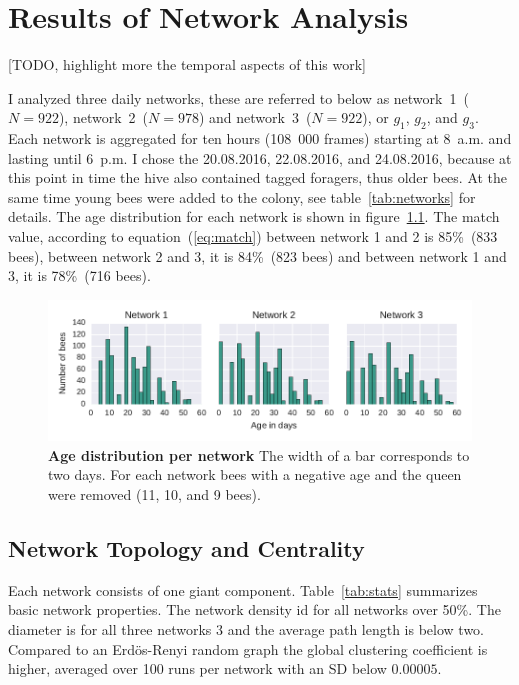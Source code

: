 \chapter{Results of Network Analysis}
\label{ch:results}

[TODO, highlight more the temporal aspects of this work]

I analyzed three daily networks, these are referred to below as network~1~($N=922$), network~2~($N=978$) and network~3~($N=922$), or $g_1$, $g_2$, and $g_3$. Each network is aggregated for ten hours (108~000 frames) starting at 8~a.m. and lasting until 6~p.m. I chose the 20.08.2016, 22.08.2016, and 24.08.2016, because at this point in time the hive also contained tagged foragers, thus older bees. At the same time young bees were added to the colony, see table~\ref{tab:networks} for details. The age distribution for each network is shown in figure~\ref{fig:ages}. The match value, according to equation~(\ref{eq:match}) between network 1 and 2 is 85\%~(833 bees), between network 2 and 3, it is 84\%~(823 bees) and between network 1 and 3, it is 78\%~(716 bees).




\begin{figure}[htb]
	\centering
	\includegraphics[width=1.0\textwidth]{Figures/ages}
	\caption[Age distribution per network]{\textbf{Age distribution per network} The width of a bar corresponds to two days. For each network bees with a negative age and the queen were removed (11, 10, and 9 bees).}
	\label{fig:ages}
\end{figure}


\section{Network Topology and Centrality}

Each network consists of one giant component. Table~\ref{tab:stats} summarizes basic network properties. The network density id for all networks over 50\%. The diameter is for all three networks $3$ and the average path length is below two. Compared to an Erdös-Renyi random graph the global clustering coefficient is higher, averaged over 100 runs per network with an SD below $0.00005$.

